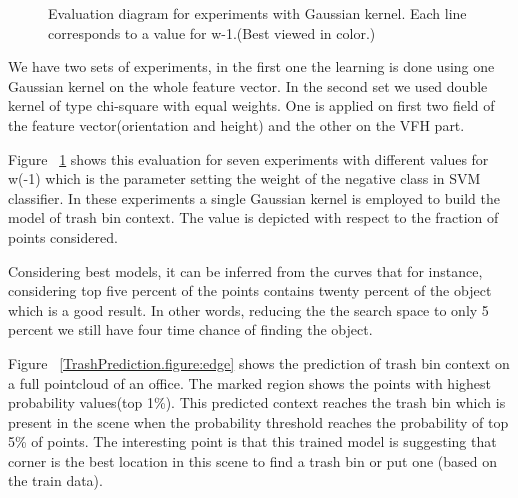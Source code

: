 \begin{figure}[t]
  \caption[Evaluation diagram for experiments with Gaussian kernel.]
  {Evaluation diagram for experiments with Gaussian kernel. Each line corresponds to a value for w-1.(Best viewed in color.)}
  \label{evalSevenExp.figure}
\end{figure}
We have two sets of experiments, in the first one the learning is done using one Gaussian kernel on the whole feature vector.
In the second set we used double kernel of type chi-square with equal weights.
One is applied on first two field of the feature vector(orientation and height) and the other on the VFH part.

Figure ~\ref{evalSevenExp.figure} shows this evaluation for seven experiments with different values for w(-1) which is the 
parameter setting the weight of the negative class in SVM classifier.
In these experiments a single Gaussian kernel is employed to build the model of trash bin context.
The value is depicted with respect to the fraction of points considered.

Considering best models, it can be inferred from the curves that for instance, considering top five percent of the points 
contains twenty percent of the object which is a good result. 
In other words, reducing the the search space to only 5 percent we still have four time chance of finding the object.



Figure ~\ref{TrashPrediction.figure:edge} shows the prediction of trash bin context on a full pointcloud of an office. 
The marked region shows the points with highest probability values(top 1\%).
This predicted context reaches the trash bin which is present in the scene when the probability threshold reaches the 
probability of top 5\% of points.
The interesting point is that this trained model is suggesting that corner is the best location in this scene to find a 
trash bin or put one (based on the train data).

